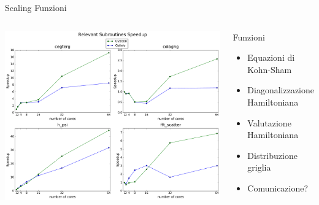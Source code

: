 \documentclass[8pt]{beamer}
\begin{document}
\begin{frame}{Scaling Funzioni} %
\begin{columns}
		\begin{center}			
			\vspace{-1cm}
			\includegraphics[width=1.1\textwidth]{beam_arch_subroutines.pdf}			
		\end{center}
		\begin{overlayarea}{\linewidth}{\textheight}
		\begin{block}{Funzioni}
			\begin{itemize}
				\item Equazioni di Kohn-Sham
				\item Diagonalizzazione Hamiltoniana
				\item Valutazione Hamiltoniana
				\item Distribuzione griglia
				\item Comunicazione?
			\end{itemize}		
		\end{block}

		\end{overlayarea}
\end{columns}

\end{frame}
\end{document}
